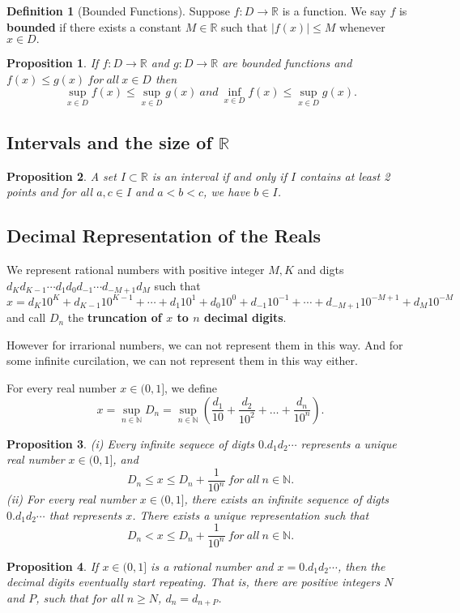 \documentclass{article}
\newtheorem{proposition}{Proposition}[section]
\theoremstyle{definition}
\newtheorem{defi}{Definition}[section]
\begin{document}
\begin{defi}[Bounded Functions]
Suppose $f:D\rightarrow \mathbb{R}$ is a function. We say $f$ is \textbf{bounded} if there exists a constant $M\in \mathbb{R}$ such that $|f(x)|\leq M$ whenever $x\in D.$
\end{defi}

\begin{proposition}
If $f:D\rightarrow \mathbb{R}$ and $g:D\rightarrow \mathbb{R}$ are bounded functions and $f(x)\leq g(x)\ for\ all\ x\in D$
then
$$\sup_{x\in D}f(x)\leq \sup_{x\in D}g(x)\ and\ \inf_{x\in D}f(x)\leq\sup_{x\in D}g(x).$$
\end{proposition}

\subsection{Intervals and the size of $\mathbb{R}$}

\begin{proposition}
A set $I\subset \mathbb{R}$ is an interval if and only if $I$ contains at least 2 points and for all $a,c\in I$ and $a<b<c$, we have $b\in I$.
\end{proposition}

\subsection{Decimal Representation of the Reals}
We represent rational numbers with positive integer $M,K$ and digts $d_{K}d_{K-1}\cdots d_{1}d_{0}d_{-1}\cdots d_{-M+1}d_{M}$ such that 
$$x=d_{K}10^{K}+d_{K-1}10^{K-1}+\cdots +d_{1}10^{1}+d_{0}10^{0}+d_{-1}10^{-1}+\cdots +d_{-M+1}10^{-M+1}+d_{M}10^{-M}$$
and call $D_{n}$ the \textbf{truncation of $x$ to $n$ decimal digits}.

However for irrarional numbers, we can not represent them in this way. And for some infinite curcilation, we can not represent them in this way either.

For every real number $x\in(0,1]$, we define 
$$x=\sup_{n\in \mathbb{N}}D_{n}=\sup_{n\in \mathbb{N}}\left( \frac{d_{1}}{10}+ \frac{d_{2}}{10^{2}}+\dots +\frac{d_{n}}{10^{n}}\right).$$

\begin{proposition}
(i) Every infinite sequece of digts $0.d_{1}d_{2}\cdots$ represents a unique real number $x\in(0,1]$, and 
$$D_{n}\leq x\leq D_{n}+\frac{1}{10^{n}}\ for\ all\ n\in \mathbb{N}.$$
(ii) For every real number $x\in(0,1]$, there exists an infinite sequence of digts $0.d_{1}d_{2}\cdots$ that represents $x$. 
There exists a unique representation such that 
$$D_{n}< x\leq D_{n}+\frac{1}{10^{n}}\ for\ all\ n\in \mathbb{N}.$$
\end{proposition}


\begin{proposition}
    If $x\in (0,1]$ is a rational number and $x=0.d_{1}d_{2}\cdots$, then the decimal digits eventually start repeating. That is, there are 
    positive integers $N$ and $P$, such that for all $n\geq N$, $d_{n}=d_{n+P}$.
\end{proposition}
\end{document}

